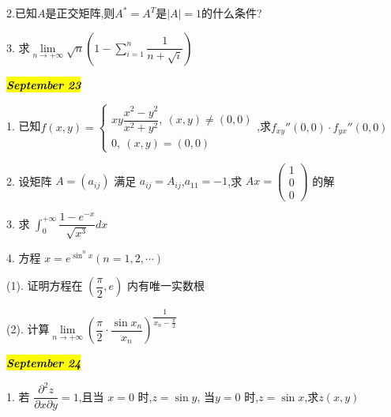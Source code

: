 2.已知$A$是正交矩阵,则$A^{*}=A^{T}$是$|A|=1$的什么条件?
\begin{solution}
	
\end{solution}

3. 求$\lim\limits_{n\rightarrow +\infty}\sqrt{n}\left( 1-\sum\limits_{i=1}^{n}\dfrac{1}{n+\sqrt{i}}\right) $
\begin{solution}
	
\end{solution}


\hl{\textbf{\textit{September 23}}}

1. 已知$f(x,y)=\left\lbrace 
\begin{array}{l}
	xy\dfrac{x^2-y^2}{x^2+y^2},\ (x,y)\neq(0,0)\\
	0,\ (x,y)=(0,0)
\end{array}
\right. $,求$f_{xy}''(0,0)\cdot f_{yx}''(0,0)$
\begin{solution}
	
\end{solution}

2. 设矩阵 $A=(a_{ij})$ 满足 $a_{ij}=A_{ij}$,$a_{11}=-1$,求 $Ax=\begin{pmatrix}
	1\\0\\0
\end{pmatrix}$ 的解
\begin{solution}
	
\end{solution}

3. 求 $\int_{0}^{+\infty}\dfrac{1-e^{-x}}{\sqrt{x^3}}dx$
\begin{solution}
	
\end{solution}

4. 方程 $x=e^{\sin^{n}x}(n=1,2,\cdots)$

(1). 证明方程在 $(\dfrac{\pi}{2},e)$ 内有唯一实数根

(2). 计算$\lim\limits_{n\rightarrow +\infty}\left(\dfrac{\pi}{2}\cdot \dfrac{\sin x_{n}}{x_{n}} \right)^{\dfrac{1}{x_{n}-\frac{\pi}{2}}}$
\begin{solution}
	
\end{solution}

\hl{\textbf{\textit{September 24}}}

1. 若 $\dfrac{\partial^2 z}{\partial x\partial y}=1$,且当 $x=0$ 时,$z=\sin y$, 当$y=0$ 时,$z=\sin x$,求$z(x,y)$
\begin{solution}
	
\end{solution}

